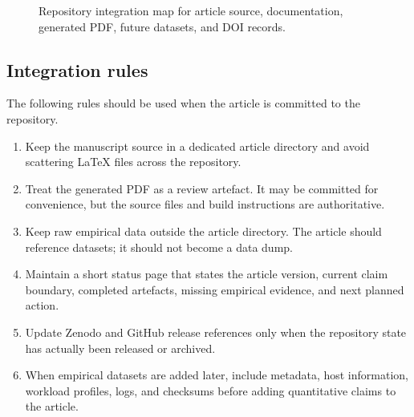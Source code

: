 \documentclass[11pt,a4paper]{article}
\begin{document}
\begin{figure}[H]
\centering
{}
\caption{Repository integration map for article source, documentation, generated PDF, future datasets, and DOI records.}
\label{fig:repository-integration}
\end{figure}

\subsection{Integration rules}
\label{subsec:integration-rules}

The following rules should be used when the article is committed to the repository.

\begin{enumerate}
  \item Keep the manuscript source in a dedicated article directory and avoid scattering LaTeX files across the repository.
  \item Treat the generated PDF as a review artefact. It may be committed for convenience, but the source files and build instructions are authoritative.
  \item Keep raw empirical data outside the article directory. The article should reference datasets; it should not become a data dump.
  \item Maintain a short status page that states the article version, current claim boundary, completed artefacts, missing empirical evidence, and next planned action.
  \item Update Zenodo and GitHub release references only when the repository state has actually been released or archived.
  \item When empirical datasets are added later, include metadata, host information, workload profiles, logs, and checksums before adding quantitative claims to the article.
\end{enumerate}
\end{document}
